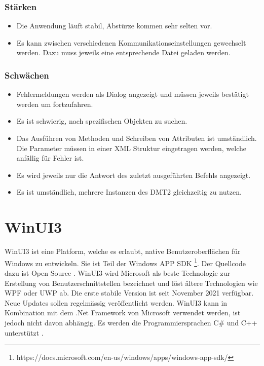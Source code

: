 \subsubsection{Stärken}
\begin{itemize}
   \item Die Anwendung läuft stabil, Abstürze kommen sehr selten vor.
   \item Es kann zwischen verschiedenen Kommunikationseinstellungen gewechselt werden. Dazu muss jeweils eine entsprechende Datei geladen werden.
\end{itemize}

\subsubsection{Schwächen}
\begin{itemize}
   \item Fehlermeldungen werden als Dialog angezeigt und müssen jeweils bestätigt werden um fortzufahren.
   \item Es ist schwierig, nach spezifischen Objekten zu suchen.
   \item Das Ausführen von Methoden und Schreiben von Attributen ist umständlich. Die Parameter müssen in einer XML Struktur eingetragen werden, welche anfällig für Fehler ist.
   \item Es wird jeweils nur die Antwort des zuletzt ausgeführten Befehls angezeigt.
   \item Es ist umständlich, mehrere Instanzen des \ac{DMT2} gleichzeitig zu nutzen. 
\end{itemize}


\section{WinUI3}
WinUI3 ist eine Platform, welche es erlaubt, native Benutzeroberflächen für Windows zu entwickeln.
Sie ist Teil der Windows APP SDK \footnote{https://docs.microsoft.com/en-us/windows/apps/windows-app-sdk/}.
Der Quellcode dazu ist Open Source \parencite{winuiintro}.
WinUI3 wird Microsoft als beste Technologie zur Erstellung von Benutzerschnittstellen bezeichnet und löst ältere Technologien wie \ac{WPF} oder \ac{UWP} ab.
Die erste stabile Version ist seit November 2021 verfügbar.
Neue Updates sollen regelmässig veröffentlicht werden.
WinUI3 kann in Kombination mit dem .Net Framework von Microsoft verwendet werden, ist jedoch nicht davon abhängig.
Es werden die Programmiersprachen C\# und C++ unterstützt \parencite{winuiroadmap}.


\pagebreak

\pagebreak




